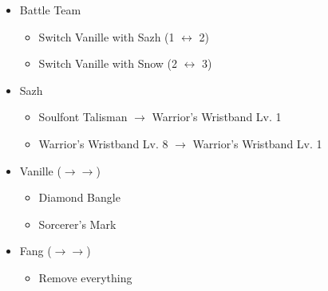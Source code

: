 \begin{multicols}{2}
\begin{menu}
\begin{itemize}
    \paradigm
    \begin{itemize}
        \item Battle Team
        \begin{itemize}
            \item Switch Vanille with Sazh (1 $\leftrightarrow$ 2)
            \item Switch Vanille with Snow (2 $\leftrightarrow$ 3)
        \end{itemize}
    \end{itemize}
    \equip
    \begin{itemize}
        \item Sazh
        \begin{itemize}
                \item Soulfont Talisman $\rightarrow$ Warrior's Wristband Lv. 1
                \item Warrior's Wristband Lv. 8 $\rightarrow$ Warrior's Wristband Lv. 1
        \end{itemize}
        \item Vanille ($\rightarrow\rightarrow$)
        \begin{itemize}
                \item Diamond Bangle
                \item Sorcerer's Mark
        \end{itemize}
        \item Fang ($\rightarrow\rightarrow$)
        \begin{itemize}
            \item Remove everything
        \end{itemize}
    \end{itemize}
\end{itemize}
\end{menu}


\end{multicols}
